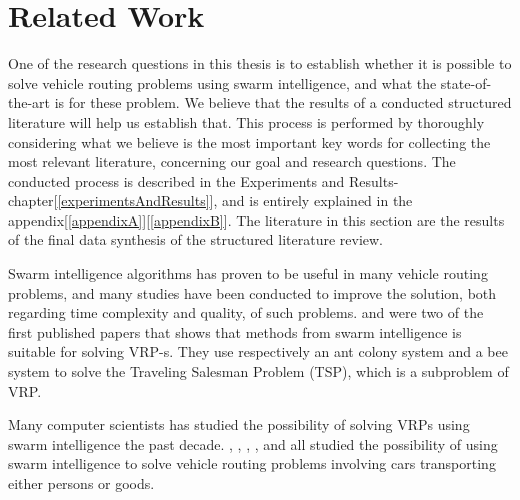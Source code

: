 \section{Related Work} 
One of the research questions in this thesis is to establish whether it is possible to solve vehicle routing problems using swarm intelligence, and what the state-of-the-art is for these problem. We believe that the results of a conducted structured literature will help us establish that. This process is performed by thoroughly considering what we believe is the most important key words for collecting the most relevant literature, concerning our goal and research questions. The conducted process is described in the Experiments and Results-chapter[\ref{experimentsAndResults}], and is entirely explained in the appendix[\ref{appendixA}][\ref{appendixB}]. The literature in this section are the results of the final data synthesis of the structured literature review. 

Swarm intelligence algorithms has proven to be useful in many vehicle routing problems, and many studies have been conducted to improve the solution, both regarding time complexity and quality, of such problems. \citet{dorigo97} and \citet{lucic03} were two of the first published papers that shows that methods from swarm intelligence is suitable for solving VRP-s. They use respectively an ant colony system and a bee system to solve the Traveling Salesman Problem (TSP), which is a subproblem of VRP. 

Many computer scientists has studied the possibility of solving VRPs using swarm intelligence the past decade. \citet{hsiao04}, \citet{salehi-nezhad07}, \citet{tripathi09}, \citet{dias14}, and \citet{sedighpour14} all studied the possibility of using swarm intelligence to solve vehicle routing problems involving cars transporting either persons or goods. 

